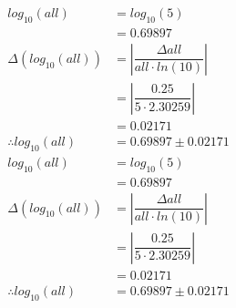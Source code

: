 \documentclass[a4paper]{article}
\begin{document}
\begin{align*}
log_{ 10 }\left( all \right) &= log_{ 10 }\left( 5 \right) \\
&= 0.69897 \\[4mm]
\Delta \left( log_{ 10 }\left( all \right) \right) &= \left| \dfrac{ \Delta all }{ all \cdot ln \left( 10 \right) } \right| \\
&= \left| \dfrac{ 0.25 }{ 5 \cdot 2.30259 } \right| \\
&= 0.02171\\[4mm]
\therefore log_{ 10 }\left( all \right) &= 0.69897 \pm 0.02171
\end{align*}
\begin{align*}
log_{ 10 }\left( all \right) &= log_{ 10 }\left( 5 \right) \\
&= 0.69897 \\[4mm]
\Delta \left( log_{ 10 }\left( all \right) \right) &= \left| \dfrac{ \Delta all }{ all \cdot ln \left( 10 \right) } \right| \\
&= \left| \dfrac{ 0.25 }{ 5 \cdot 2.30259 } \right| \\
&= 0.02171\\[4mm]
\therefore log_{ 10 }\left( all \right) &= 0.69897 \pm 0.02171
\end{align*}
\end{document}
